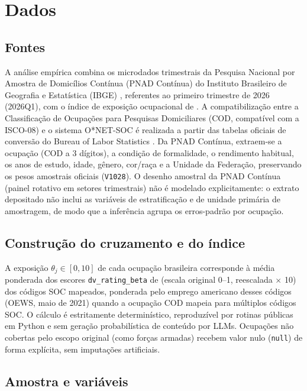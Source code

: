 \section{Dados}
\label{sec:dados}

\subsection{Fontes}

A análise empírica combina os microdados trimestrais da Pesquisa Nacional por Amostra de Domicílios Contínua (PNAD Contínua) do Instituto Brasileiro de Geografia e Estatística (IBGE) \citep{ibgepnad}, referentes ao primeiro trimestre de 2026 (2026Q1), com o índice de exposição ocupacional de \citet{eloundou2024gpts}. A compatibilização entre a Classificação de Ocupações para Pesquisas Domiciliares (COD, compatível com a ISCO-08) e o sistema O*NET-SOC é realizada a partir das tabelas oficiais de conversão do Bureau of Labor Statistics \citep{blscrosswalk}. Da PNAD Contínua, extraem-se a ocupação (COD a 3 dígitos), a condição de formalidade, o rendimento habitual, os anos de estudo, idade, gênero, cor/raça e a Unidade da Federação, preservando os pesos amostrais oficiais (\texttt{V1028}). O desenho amostral da PNAD Contínua (painel rotativo em setores trimestrais) não é modelado explicitamente: o extrato depositado não inclui as variáveis de estratificação e de unidade primária de amostragem, de modo que a inferência agrupa os erros-padrão por ocupação.

\subsection{Construção do cruzamento e do índice}

A exposição $\theta_j \in [0, 10]$ de cada ocupação brasileira corresponde à média ponderada dos escores \texttt{dv\_rating\_beta} de \citet{eloundou2024gpts} (escala original 0--1, reescalada $\times$ 10) dos códigos SOC mapeados, ponderada pelo emprego americano desses códigos (OEWS, maio de 2021) quando a ocupação COD mapeia para múltiplos códigos SOC. O cálculo é estritamente determinístico, reproduzível por rotinas públicas em Python e sem geração probabilística de conteúdo por LLMs. Ocupações não cobertas pelo escopo original (como forças armadas) recebem valor nulo (\texttt{null}) de forma explícita, sem imputações artificiais.

\subsection{Amostra e variáveis}

